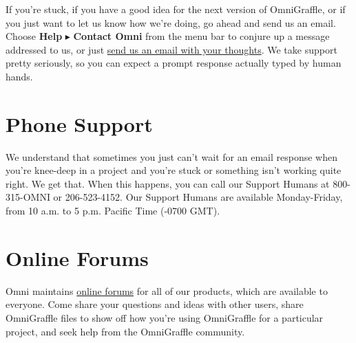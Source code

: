 \documentclass[../main.tex]{subfiles}
\begin{document}
If you're stuck, if you have a good idea for the next version of OmniGraffle, or if you just
want to let us know how we're doing, go ahead and send us an email. Choose \textbf{Help}
$\blacktriangleright$ \textbf{Contact Omni} from the menu bar to conjure up a message
addressed to us, or just \href{mailto:omnigraffle@omnigroup.com}{send us an email with your
thoughts}. We take support pretty seriously, so you can expect a prompt response actually
typed by human hands.

\section{Phone Support}

We understand that sometimes you just can't wait for an email response when you're knee-deep in
a project and you're stuck or something isn't working quite right. We get that. When this
happens, you can call our Support Humans at 800-315-OMNI or 206-523-4152. Our Support Humans
are available Monday-Friday, from 10 a.m. to 5 p.m. Pacific Time (-0700 GMT).

\section{Online Forums}

Omni maintains \href{http://discourse.omnigroup.com}{online forums} for all of our products,
which are available to everyone. Come share your questions and ideas with other users, share
OmniGraffle files to show off how you're using OmniGraffle for a particular project, and seek
help from the OmniGraffle community.
\end{document}

